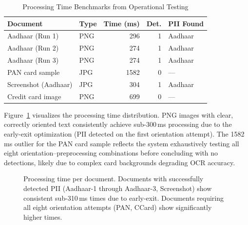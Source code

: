 \documentclass[conference]{IEEEtran}
\begin{document}
\begin{table}[htbp]
\caption{Processing Time Benchmarks from Operational Testing}
\label{tab:benchmarks}
\centering
\begin{tabular}{@{}llrrl@{}}
\toprule
\textbf{Document} & \textbf{Type} & \textbf{Time (ms)} & \textbf{Det.} & \textbf{PII Found} \\
\midrule
Aadhaar (Run 1)     & PNG & 296  & 1 & Aadhaar \\
Aadhaar (Run 2)     & PNG & 274  & 1 & Aadhaar \\
Aadhaar (Run 3)     & PNG & 274  & 1 & Aadhaar \\
PAN card sample     & JPG & 1582 & 0 & --- \\
Screenshot (Aadhaar)& JPG & 304  & 1 & Aadhaar \\
Credit card image   & PNG & 699  & 0 & --- \\
\bottomrule
\end{tabular}
\end{table}

Figure~\ref{fig:processing_times} visualizes the processing time distribution. PNG images with clear, correctly oriented text consistently achieve sub-300\,ms processing due to the early-exit optimization (PII detected on the first orientation attempt). The 1582\,ms outlier for the PAN card sample reflects the system exhaustively testing all eight orientation--preprocessing combinations before concluding with no detections, likely due to complex card backgrounds degrading OCR accuracy.

\begin{figure}[htbp]
\centering
{}
\caption{Processing time per document. Documents with successfully detected PII (Aadhaar-1 through Aadhaar-3, Screenshot) show consistent sub-310\,ms times due to early-exit. Documents requiring all eight orientation attempts (PAN, CCard) show significantly higher times.}
\label{fig:processing_times}
\end{figure}
\end{document}
